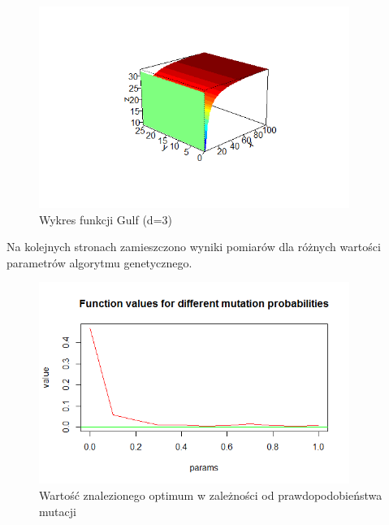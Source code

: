 \documentclass[11pt, a4paper]{article}
\newcommand{\fbi}{\leavevmode{\parindent=1em\indent}}
\begin{document}
\begin{figure}[H]
	\begin{center}
		\includegraphics[width=0.9\textwidth]{./assets/gulf1.png} %
		\caption{Wykres funkcji Gulf (d=3)}
		\label{fig:gulf1}
	\end{center}
\end{figure}

\fbi
Na kolejnych stronach zamieszczono wyniki pomiarów dla różnych wartości parametrów algorytmu genetycznego.

\begin{figure}[H]
	\begin{center}
		\includegraphics[width=0.9\textwidth]{./assets/gulf2.png} %
		\caption{Wartość znalezionego optimum w zależności od prawdopodobieństwa mutacji}
		\label{fig:gulf2}
	\end{center}
\end{figure}
\end{document}
